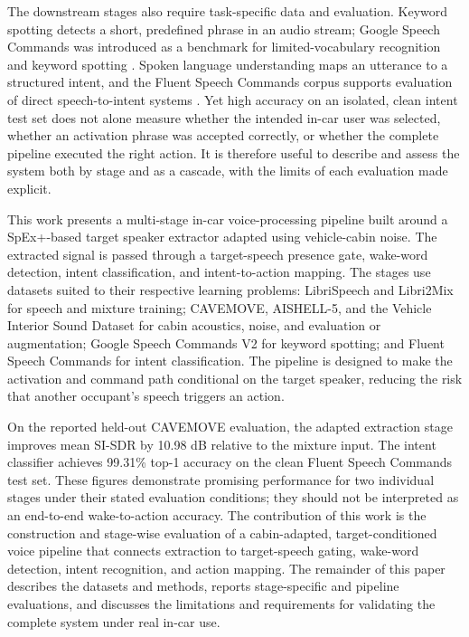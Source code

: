 The downstream stages also require task-specific data and evaluation. Keyword spotting detects a short, predefined phrase in an audio stream; Google Speech Commands was introduced as a benchmark for limited-vocabulary recognition and keyword spotting \cite{speechcommands}. Spoken language understanding maps an utterance to a structured intent, and the Fluent Speech Commands corpus supports evaluation of direct speech-to-intent systems \cite{fluentcommands}. Yet high accuracy on an isolated, clean intent test set does not alone measure whether the intended in-car user was selected, whether an activation phrase was accepted correctly, or whether the complete pipeline executed the right action. It is therefore useful to describe and assess the system both by stage and as a cascade, with the limits of each evaluation made explicit.

This work presents a multi-stage in-car voice-processing pipeline built around a SpEx+-based target speaker extractor adapted using vehicle-cabin noise. The extracted signal is passed through a target-speech presence gate, wake-word detection, intent classification, and intent-to-action mapping. The stages use datasets suited to their respective learning problems: LibriSpeech and Libri2Mix for speech and mixture training; CAVEMOVE, AISHELL-5, and the Vehicle Interior Sound Dataset for cabin acoustics, noise, and evaluation or augmentation; Google Speech Commands V2 for keyword spotting; and Fluent Speech Commands for intent classification. The pipeline is designed to make the activation and command path conditional on the target speaker, reducing the risk that another occupant's speech triggers an action.

On the reported held-out CAVEMOVE evaluation, the adapted extraction stage improves mean SI-SDR by 10.98 dB relative to the mixture input. The intent classifier achieves 99.31\% top-1 accuracy on the clean Fluent Speech Commands test set. These figures demonstrate promising performance for two individual stages under their stated evaluation conditions; they should not be interpreted as an end-to-end wake-to-action accuracy. The contribution of this work is the construction and stage-wise evaluation of a cabin-adapted, target-conditioned voice pipeline that connects extraction to target-speech gating, wake-word detection, intent recognition, and action mapping. The remainder of this paper describes the datasets and methods, reports stage-specific and pipeline evaluations, and discusses the limitations and requirements for validating the complete system under real in-car use.
